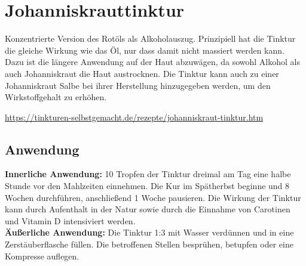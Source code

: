 


\newpage



\section{Johanniskrauttinktur}

Konzentrierte Version des Rotöls als Alkoholauszug. Prinzipiell hat die Tinktur die gleiche Wirkung wie das Öl, nur dass damit nicht massiert werden kann. Dazu ist die längere Anwendung auf der Haut abzuwägen, da sowohl Alkohol als auch Johanniskraut die Haut austrocknen. Die Tinktur kann auch zu einer Johanniskraut Salbe bei ihrer Herstellung hinzugegeben werden, um den Wirkstoffgehalt zu erhöhen.

\cite{tinkturen} \cite{nedoma2018heiltinkturen}

\url{https://tinkturen-selbstgemacht.de/rezepte/johanniskraut-tinktur.htm}

     
               

\subsection{Anwendung}

\textbf{Innerliche Anwendung:} 10 Tropfen der Tinktur dreimal am Tag eine halbe Stunde vor den Mahlzeiten einnehmen. Die Kur im Spätherbst beginne und 8 Wochen durchführen, anschließend 1 Woche pausieren. Die Wirkung der Tinktur kann durch Aufenthalt in der Natur sowie durch die Einnahme von Carotinen und Vitamin D intensiviert werden.\\

\textbf{Äußerliche Anwendung:} Die Tinktur 1:3 mit Wasser verdünnen und in eine Zerstäuberflasche füllen. Die betroffenen Stellen besprühen, betupfen oder eine Kompresse auflegen.\\

